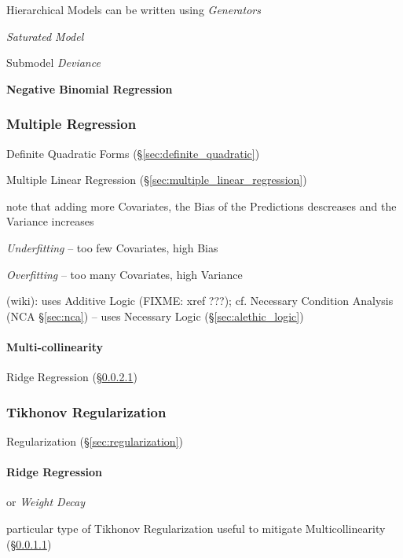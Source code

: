 Hierarchical Models can be written using \emph{Generators}

\emph{Saturated Model}

Submodel \emph{Deviance}

\textbf{Negative Binomial Regression}



\subsubsection{Multiple Regression}\label{sec:multiple_regression}

Definite Quadratic Forms (\S\ref{sec:definite_quadratic})

Multiple Linear Regression (\S\ref{sec:multiple_linear_regression})

note that adding more Covariates, the Bias of the Predictions descreases and the
Variance increases

\emph{Underfitting} -- too few Covariates, high Bias

\emph{Overfitting} -- too many Covariates, high Variance

(wiki): uses Additive Logic (FIXME: xref ???); cf. Necessary Condition Analysis
(NCA \S\ref{sec:nca}) -- uses Necessary Logic (\S\ref{sec:alethic_logic})



\paragraph{Multi-collinearity}\label{sec:multicollinearity}\hfill

Ridge Regression (\S\ref{sec:ridge_regression})



\subsubsection{Tikhonov Regularization}\label{sec:tikhonov_regularization}\hfill

Regularization (\S\ref{sec:regularization})



\paragraph{Ridge Regression}\label{sec:ridge_regression}\hfill

or \emph{Weight Decay}

particular type of Tikhonov Regularization useful to mitigate Multicollinearity
(\S\ref{sec:multicollinearity})



